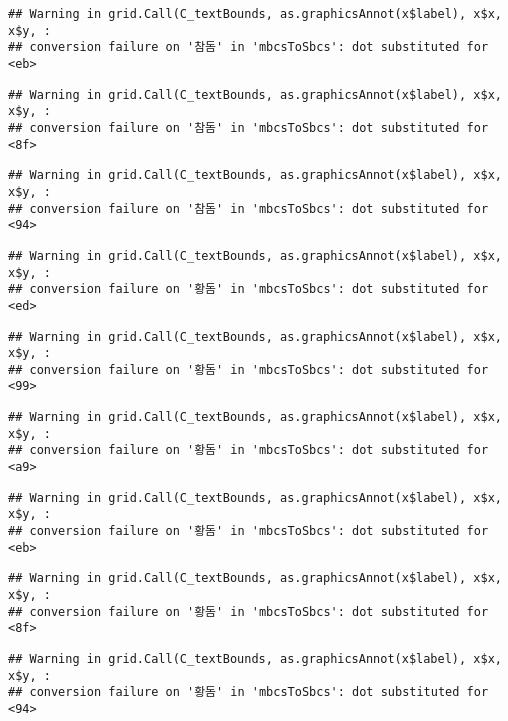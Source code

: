 \documentclass[
]{article}
\begin{document}
\begin{verbatim}
## Warning in grid.Call(C_textBounds, as.graphicsAnnot(x$label), x$x, x$y, :
## conversion failure on '참돔' in 'mbcsToSbcs': dot substituted for <eb>
\end{verbatim}

\begin{verbatim}
## Warning in grid.Call(C_textBounds, as.graphicsAnnot(x$label), x$x, x$y, :
## conversion failure on '참돔' in 'mbcsToSbcs': dot substituted for <8f>
\end{verbatim}

\begin{verbatim}
## Warning in grid.Call(C_textBounds, as.graphicsAnnot(x$label), x$x, x$y, :
## conversion failure on '참돔' in 'mbcsToSbcs': dot substituted for <94>
\end{verbatim}

\begin{verbatim}
## Warning in grid.Call(C_textBounds, as.graphicsAnnot(x$label), x$x, x$y, :
## conversion failure on '황돔' in 'mbcsToSbcs': dot substituted for <ed>
\end{verbatim}

\begin{verbatim}
## Warning in grid.Call(C_textBounds, as.graphicsAnnot(x$label), x$x, x$y, :
## conversion failure on '황돔' in 'mbcsToSbcs': dot substituted for <99>
\end{verbatim}

\begin{verbatim}
## Warning in grid.Call(C_textBounds, as.graphicsAnnot(x$label), x$x, x$y, :
## conversion failure on '황돔' in 'mbcsToSbcs': dot substituted for <a9>
\end{verbatim}

\begin{verbatim}
## Warning in grid.Call(C_textBounds, as.graphicsAnnot(x$label), x$x, x$y, :
## conversion failure on '황돔' in 'mbcsToSbcs': dot substituted for <eb>
\end{verbatim}

\begin{verbatim}
## Warning in grid.Call(C_textBounds, as.graphicsAnnot(x$label), x$x, x$y, :
## conversion failure on '황돔' in 'mbcsToSbcs': dot substituted for <8f>
\end{verbatim}

\begin{verbatim}
## Warning in grid.Call(C_textBounds, as.graphicsAnnot(x$label), x$x, x$y, :
## conversion failure on '황돔' in 'mbcsToSbcs': dot substituted for <94>
\end{verbatim}
\end{document}
